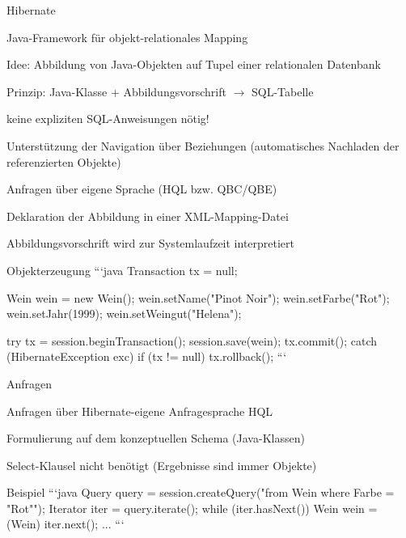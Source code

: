 \documentclass[a4paper]{article}
\begin{document}
\begin{multicols}{3}
Hibernate
\begin{itemize*}
    \item Java-Framework für objekt-relationales Mapping
    \item Idee: Abbildung von Java-Objekten auf Tupel einer relationalen Datenbank
    \item Prinzip: Java-Klasse + Abbildungsvorschrift $\rightarrow$ SQL-Tabelle
    \item keine expliziten SQL-Anweisungen nötig!
    \item Unterstützung der Navigation über Beziehungen (automatisches Nachladen der referenzierten Objekte)
    \item Anfragen über eigene Sprache (HQL bzw. QBC/QBE)
    \item Deklaration der Abbildung in einer XML-Mapping-Datei
    \item Abbildungsvorschrift wird zur Systemlaufzeit interpretiert
\end{itemize*}

Objekterzeugung
```java
Transaction tx = null;

Wein wein = new Wein();
wein.setName("Pinot Noir");
wein.setFarbe("Rot");
wein.setJahr(1999);
wein.setWeingut("Helena");

try {
        tx = session.beginTransaction();
        session.save(wein);
        tx.commit();
    } catch (HibernateException exc) {
        if (tx != null) tx.rollback();
    }
```

Anfragen
\begin{itemize*}
    \item Anfragen über Hibernate-eigene Anfragesprache HQL
    \item Formulierung auf dem konzeptuellen Schema (Java-Klassen)
    \item Select-Klausel nicht benötigt (Ergebnisse sind immer Objekte)
    \item Beispiel
    ```java
    Query query = session.createQuery("from Wein where Farbe = "Rot"");
    Iterator iter = query.iterate();
    while (iter.hasNext()) {
            Wein wein = (Wein) iter.next();
            ...
        }
    ```
\end{itemize*}


\end{multicols}
\end{document}
